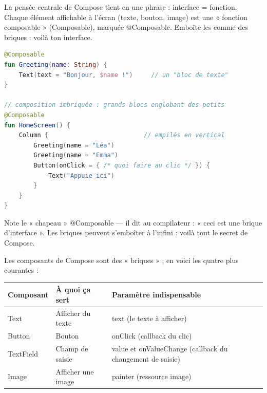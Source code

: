 


La pensée centrale de Compose tient en une phrase : interface = fonction. Chaque élément affichable à l'écran (texte, bouton, image) est une « fonction composable » (Composable), marquée @Composable. Emboîte-les comme des briques : voilà ton interface.

\begin{lstlisting}[language=Kotlin]
@Composable
fun Greeting(name: String) {
    Text(text = "Bonjour, $name !")     // un "bloc de texte"
}

// composition imbriquée : grands blocs englobant des petits
@Composable
fun HomeScreen() {
    Column {                          // empilés en vertical
        Greeting(name = "Léa")
        Greeting(name = "Emma")
        Button(onClick = { /* quoi faire au clic */ }) {
            Text("Appuie ici")
        }
    }
}
\end{lstlisting}

Note le « chapeau » @Composable — il dit au compilateur : « ceci est une brique d'interface ». Les briques peuvent s'emboîter à l'infini : voilà tout le secret de Compose.


Les composants de Compose sont des « briques » ; en voici les quatre plus courantes :

\begin{center}
\begin{tabularx}{\linewidth}{|X|X|X|}
\hline
\textbf{Composant} & \textbf{À quoi ça sert} & \textbf{Paramètre indispensable} \tabularnewline
\hline
Text & Afficher du texte & text (le texte à afficher) \tabularnewline
Button & Bouton & onClick (callback du clic) \tabularnewline
TextField & Champ de saisie & value et onValueChange (callback du changement de saisie) \tabularnewline
Image & Afficher une image & painter (ressource image) \tabularnewline
\hline
\end{tabularx}
\end{center}

